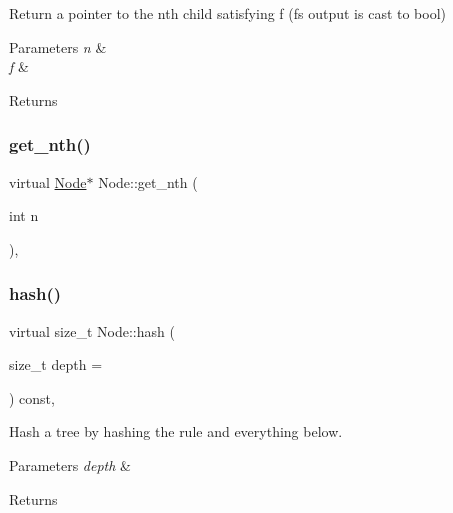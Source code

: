 Return a pointer to the n\textquotesingle{}th child satisfying f (f\textquotesingle{}s output is cast to bool) 
\begin{DoxyParams}{Parameters}
{\em n} & \\
\hline
{\em f} & \\
\hline
\end{DoxyParams}
\begin{DoxyReturn}{Returns}

\end{DoxyReturn}
\mbox{\label{class_node_a224c0ee6dae35ddce70f8fd3b91e0b1c}} 
\subsubsection{\texorpdfstring{get\+\_\+nth()}{get\_nth()}\hspace{0.1cm}{\footnotesize\ttfamily [2/2]}}
{\footnotesize\ttfamily virtual \hyperlink{class_node}{Node}$\ast$ Node\+::get\+\_\+nth (\begin{DoxyParamCaption}\item[{int}]{n }\end{DoxyParamCaption})\hspace{0.3cm}{\ttfamily [inline]}, {\ttfamily [virtual]}}

\mbox{\label{class_node_a212f2e1ba4ff71de6954b0b791d89979}} 
\subsubsection{\texorpdfstring{hash()}{hash()}}
{\footnotesize\ttfamily virtual size\+\_\+t Node\+::hash (\begin{DoxyParamCaption}\item[{size\+\_\+t}]{depth = {} }\end{DoxyParamCaption}) const\hspace{0.3cm}{\ttfamily [inline]}, {\ttfamily [virtual]}}

Hash a tree by hashing the rule and everything below. 
\begin{DoxyParams}{Parameters}
{\em depth} & \\
\hline
\end{DoxyParams}
\begin{DoxyReturn}{Returns}

\end{DoxyReturn}
\mbox{\label{class_node_ac2e36754ba8b1b1d452deeb2bdbd346f}} 
